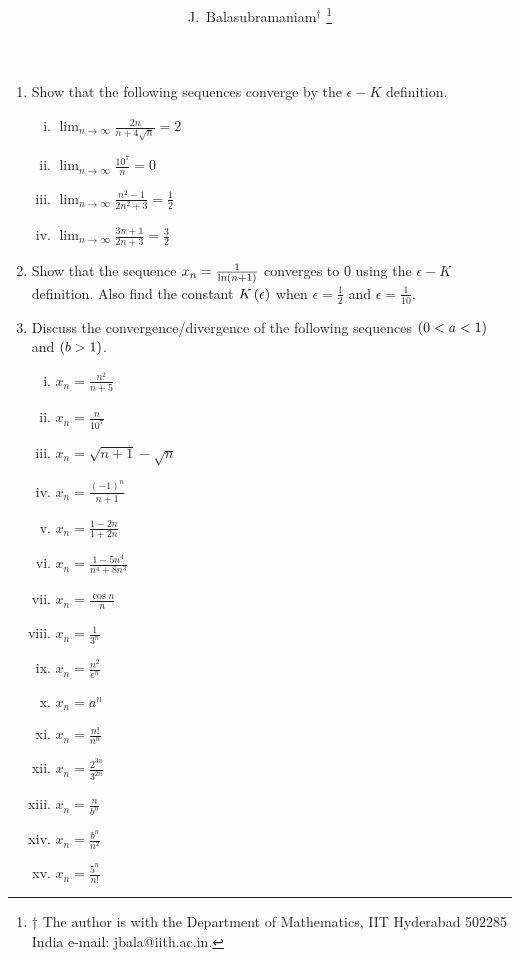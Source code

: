 \documentclass[journal,12pt,onecolumn]{IEEEtran}
\begin{document}
\newcommand{\solution}{\noindent \textbf{Solution: }}
\providecommand{\dec}[2]{\ensuremath{\overset{#1}{\underset{#2}{\gtrless}}}}
\title{ 
}
\author{J.~Balasubramaniam$^{\dagger}$ %
\thanks{$\dagger$ The author is with the Department of Mathematics, IIT Hyderabad
502285 India e-mail: jbala@iith.ac.in. }
}
\maketitle
\begin{enumerate}
\setlength\itemsep{1.5em}
\item Show that the following sequences converge by the $\epsilon-K$ definition.
\begin{multicols}{2}
\begin{enumerate}[(i)]
\setlength\itemsep{2em}

\item
$
\lim_{n \rightarrow \infty} \frac{2n}{n+4\sqrt{n}} = 2
$
\item
$
\lim_{n \rightarrow \infty} \frac{10^7}{n} = 0
$ 
\item
$
\lim_{n \rightarrow \infty} \frac{n^2-1}{2n^2+3} = \frac{1}{2}
$
\item
$
\lim_{n \rightarrow \infty} \frac{3n+1}{2n+3} = \frac{3}{2}
$
\end{enumerate}
\end{multicols}
\item Show that the sequence $x_n = \frac{1}{\ln \left(n+1\right)}$ converges to 0 using the $\epsilon-K$ definition.  Also find
the constant $K\left(\epsilon\right)$ when $\epsilon = \frac{1}{2}$  and $\epsilon = \frac{1}{10}$.
\item Discuss the convergence/divergence of the following sequences $\left(0 < a < 1\right)$ and $\left(b > 1\right)$.
\begin{multicols}{3}
\begin{enumerate}[(i)]
\setlength\itemsep{2em}
\item
$
x_n = \frac{n^2}{n+5}
$
\item
$
x_n = \frac{n}{10^7}
$
\item
$
x_n = \sqrt{n+1}-\sqrt{n}
$
\item
$
x_n = \frac{(-1)^n}{n+1}
$
\item
$
x_n = \frac{1-2n}{1+2n}
$
\item
$
x_n = \frac{1-5n^4}{n^4+8n^3}
$
\item
$
x_n = \frac{\cos n}{n}
$
\item
$
x_n = \frac{1}{3^n}
$
\item
$
x_n = \frac{n^2}{e^n}
$
\item
$
x_n = a^n
$
\item
$
x_n = \frac{n!}{n^n}
$
\item
$
x_n = \frac{2^{3n}}{3^{2n}}
$
\item
$
x_n = \frac{n}{b^n}
$
\item
$
x_n = \frac{b^n}{n^2}
$
\item
$
x_n = \frac{5^n}{n!}
$


\end{enumerate}
\end{multicols}
\end{enumerate}
\end{document}
